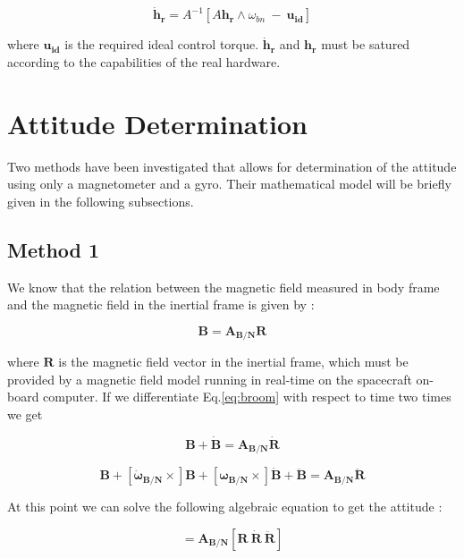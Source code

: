 \documentclass[11pt,a4paper]{report}
\begin{document}
\begin{equation}
 \mathbf{\dot{h}_r} = \mathit{A}^{-1} [A\mathbf{h_r} \wedge \omega_{bn} \ - \ \mathbf{u_{id}}]
\end{equation}

where $\mathbf{u_{id}}$ is the required ideal control torque. 
$\mathbf{\dot{h}_r}$ and $\mathbf{{h}_r}$ must be satured according to the capabilities of the real hardware.

\chapter{Attitude Determination}
Two methods have been investigated that allows for determination of the attitude using only a magnetometer and a gyro. Their mathematical model will be briefly given in the following subsections.

\section{Method 1}
We know that the relation between the magnetic field measured in body frame and the magnetic field in the inertial frame is given by : 

\begin{equation}
 \label{eq:broom}
 \mathbf{B}=\mathbf{A_{B/N}}\mathbf{R}
\end{equation}

where $\mathbf{R}$ is the magnetic field vector in the inertial frame, which must be provided by a magnetic field model running in real-time on the spacecraft on-board computer.
If we differentiate Eq.\ref{eq:broom} with respect to time two times we get 

\begin{equation}
 [\mathbf{\omega_{B/N}} \times]\mathbf{B} + \mathbf{\dot{B}}=\mathbf{A_{B/N}}\mathbf{\dot{R}}
\end{equation}

\begin{equation}
 [\mathbf{\omega_{B/N}} \times][\mathbf{\omega_{B/N}} \times]\mathbf{B} + [\mathbf{\dot{\omega}_{B/N}} \times]\mathbf{B} + [\mathbf{\omega_{B/N}} \times]\mathbf{\dot{B}} + \mathbf{\ddot{B}}=\mathbf{A_{B/N}}\mathbf{\ddot{R}}
\end{equation}

At this point we can solve the following algebraic equation to get the attitude : 

\begin{equation}
[\mathbf{B} \ \mathbf{S_{1}} \ \mathbf{S_{2}}]=\mathbf{A_{B/N}}[\mathbf{R} \ \mathbf{\dot{R}} \ \mathbf{\ddot{R}}]
\end{equation}
\end{document}
